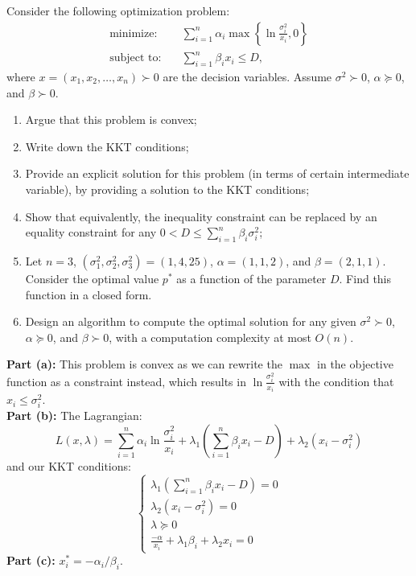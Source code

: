 \documentclass[11pt]{article}
\begin{document}
\begin{homeworkProblem}

    Consider the following optimization problem:
    \begin{align*}
        \text{minimize:} \quad   & \sum_{i=1}^n \alpha_{i} \max \left\{ \ln \frac{\sigma_i^2}{x_i}, 0 \right\} \\
        \text{subject to:} \quad & \sum_{i=1}^n \beta_{i} x_{i} \leq D,
    \end{align*}
    where $x = (x_1, x_2, \ldots, x_n) \succ 0$ are the decision variables. Assume $\sigma^2 \succ 0$, $\alpha \succeq 0$, and $\beta \succ 0$.

    \begin{enumerate}[label=(\alph*), topsep=5pt, itemsep=5pt]
        \item Argue that this problem is convex;
        \item Write down the KKT conditions;
        \item Provide an explicit solution for this problem (in terms of certain intermediate variable), by providing a solution to the KKT conditions;
        \item Show that equivalently, the inequality constraint can be replaced by an equality constraint for any $0 < D \leq \sum_{i=1}^n \beta_{i} \sigma_{i}^2$;
        \item Let $n=3$, $(\sigma_1^2, \sigma_2^2, \sigma_3^2) = (1, 4, 25)$, $\alpha = (1,1,2)$, and $\beta = (2, 1, 1).$ Consider the optimal value $p^*$ as a function of the parameter $D$. Find this function in a closed form.
        \item Design an algorithm to compute the optimal solution for any given $\sigma^2 \succ 0$, $\alpha \succeq 0$, and $\beta \succ 0$, with a computation complexity at most $O(n)$. \newline
    \end{enumerate}

    \solution

    \textbf{Part (a):} This problem is convex as we can rewrite the $\max$ in the objective function as a constraint instead, which results in $\ln \frac{\sigma_i^2}{x_i}$ with the condition that $x_i \leq \sigma_i^2$. \\

    \textbf{Part (b):} The Lagrangian:
    \[
        L(x, \lambda ) = \sum_{i=1}^n \alpha_{i} \ln \frac{\sigma_i^2}{x_i} + \lambda_1 \left( \sum_{i=1}^n \beta_{i} x_{i} - D \right) + \lambda_2 (x_i - \sigma_i^2)
    \]
    and our KKT conditions:
    \[
        \begin{cases}
            \lambda_1 \left( \sum_{i=1}^n \beta_{i} x_{i} - D \right) = 0 \\
            \lambda_2 (x_i - \sigma_i^2) = 0                              \\
            \lambda \succeq 0                                             \\
            \frac{-\alpha}{x_i} + \lambda_1 \beta_i + \lambda_2 x_i = 0
        \end{cases}
    \]
    \textbf{Part (c):} $x_i^* = -\alpha_i/\beta_i$. \\


\end{homeworkProblem}
\end{document}

